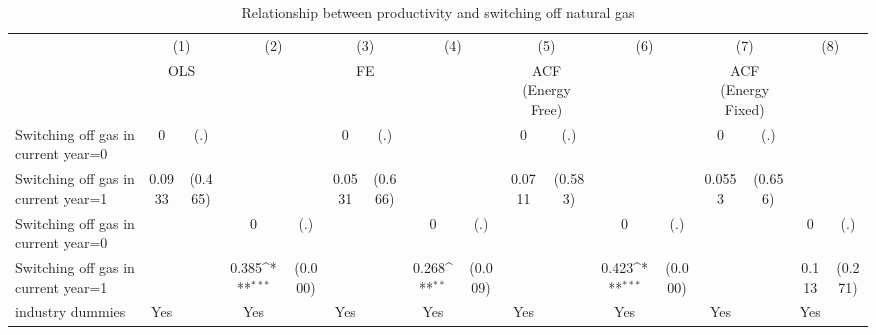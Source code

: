\begin{table}[htbp]\centering
\def\sym#1{\ifmmode^{#1}\else\(^{#1}\)\fi}
\caption{Relationship between productivity and switching off natural gas}
\begin{tabular}{l*{8}{cc}}
\toprule
                    &\multicolumn{2}{c}{(1)}           &\multicolumn{2}{c}{(2)}           &\multicolumn{2}{c}{(3)}           &\multicolumn{2}{c}{(4)}           &\multicolumn{2}{c}{(5)}           &\multicolumn{2}{c}{(6)}           &\multicolumn{2}{c}{(7)}           &\multicolumn{2}{c}{(8)}           \\
                    &\multicolumn{2}{c}{OLS}           &\multicolumn{2}{c}{}              &\multicolumn{2}{c}{FE}            &\multicolumn{2}{c}{}              &\multicolumn{2}{c}{ACF (Energy Free)}&\multicolumn{2}{c}{}              &\multicolumn{2}{c}{ACF (Energy Fixed)}&\multicolumn{2}{c}{}              \\
\midrule
Switching off gas in current year=0&           0         &         (.)&                     &            &           0         &         (.)&                     &            &           0         &         (.)&                     &            &           0         &         (.)&                     &            \\
Switching off gas in current year=1&      0.0933         &     (0.465)&                     &            &      0.0531         &     (0.666)&                     &            &      0.0711         &     (0.583)&                     &            &      0.0553         &     (0.656)&                     &            \\
Switching off gas in current year=0&                     &            &           0         &         (.)&                     &            &           0         &         (.)&                     &            &           0         &         (.)&                     &            &           0         &         (.)\\
Switching off gas in current year=1&                     &            &       0.385\sym{***}&     (0.000)&                     &            &       0.268\sym{**} &     (0.009)&                     &            &       0.423\sym{***}&     (0.000)&                     &            &       0.113         &     (0.271)\\
industry dummies    &         Yes         &            &         Yes         &            &         Yes         &            &         Yes         &            &         Yes         &            &         Yes         &            &         Yes         &            &         Yes         &            \\

\end{tabular}
\end{table}

